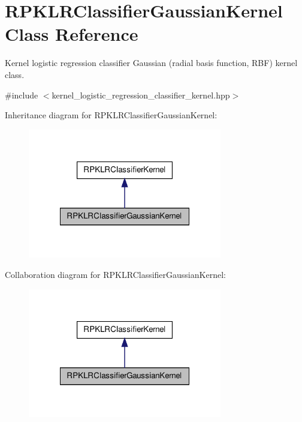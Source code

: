 \hypertarget{class_r_p_k_l_r_classifier_gaussian_kernel}{\section{\-R\-P\-K\-L\-R\-Classifier\-Gaussian\-Kernel \-Class \-Reference}
\label{class_r_p_k_l_r_classifier_gaussian_kernel}
}


\-Kernel logistic regression classifier \-Gaussian (radial basis function, \-R\-B\-F) kernel class.  




{\ttfamily \#include $<$kernel\-\_\-logistic\-\_\-regression\-\_\-classifier\-\_\-kernel.\-hpp$>$}



\-Inheritance diagram for \-R\-P\-K\-L\-R\-Classifier\-Gaussian\-Kernel\-:\nopagebreak
\begin{figure}[H]
\begin{center}
\leavevmode
\includegraphics[width=240pt]{class_r_p_k_l_r_classifier_gaussian_kernel__inherit__graph}
\end{center}
\end{figure}


\-Collaboration diagram for \-R\-P\-K\-L\-R\-Classifier\-Gaussian\-Kernel\-:\nopagebreak
\begin{figure}[H]
\begin{center}
\leavevmode
\includegraphics[width=240pt]{class_r_p_k_l_r_classifier_gaussian_kernel__coll__graph}
\end{center}
\end{figure}
